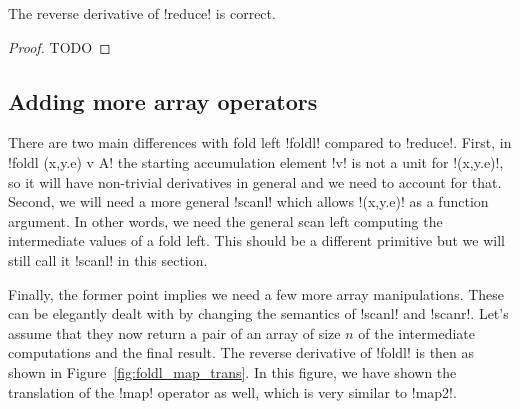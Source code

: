 \begin{proposition}
    The reverse derivative of !reduce! is correct.
\end{proposition}

\begin{proof}
    TODO
\end{proof}

\subsection{Adding more array operators}
\label{sub:lift_more_arr_op}

There are two main differences with fold left !foldl! compared to !reduce!. 
First, in !foldl (x,y.e) v A! the starting accumulation element !v! is not a unit for !(x,y.e)!,
so it will have non-trivial derivatives in general and we need to account for that.
Second, we will need a more general !scanl! which allows !(x,y.e)! as a function argument. 
In other words, we need the general scan left computing the intermediate values of a fold left.
This should be a different primitive but we will still call it !scanl! in this section.

Finally, the former point implies we need a few more array manipulations.
These can be elegantly dealt with by changing the semantics of !scanl! and !scanr!. 
Let's assume that they now return a pair of an array of size $n$ 
of the intermediate computations and the final result.
The reverse derivative of !foldl! is then as shown in Figure~\ref{fig:foldl_map_trans}.
In this figure, we have shown the translation of the !map! operator as well, which is very similar to !map2!.

